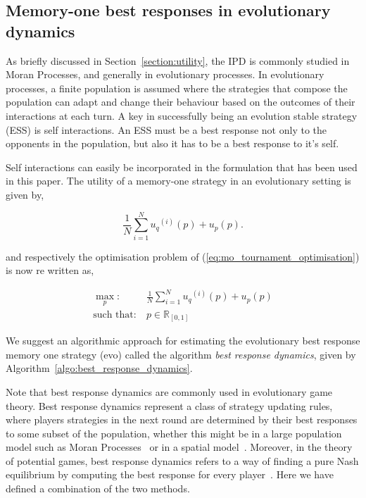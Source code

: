 \documentclass[10pt]{article}
\newcommand{\R}{\mathbb{R}}
\begin{document}
\subsection{Memory-one best responses in evolutionary dynamics}

As briefly discussed in Section~\ref{section:utility}, the IPD is commonly
studied in Moran Processes, and generally in evolutionary processes. In
evolutionary processes, a finite population is assumed where the strategies that
compose the population can adapt and change their behaviour based on the
outcomes of their interactions at each turn. A key in successfully being an
evolution stable strategy (ESS) is self interactions. An ESS must be a best
response not only to the opponents in the population, but also it has to be a
best response to it's self.

Self interactions can easily be incorporated in the formulation that has been used
in this paper. The utility of a memory-one strategy in an evolutionary setting
is given by,

\begin{equation}
    \frac{1}{N} \sum\limits_{i=1} ^ {N} {u_q}^{(i)} (p) + u_p(p).
\end{equation}

and respectively the optimisation problem of (\ref{eq:mo_tournament_optimisation})
is now re written as,

\begin{equation}\label{eq:mo_evolutionary_optimisation}
    \begin{aligned}
    \max_p: & \ \frac{1}{N} \sum\limits_{i=1} ^ {N} {u_q}^{(i)} (p) + u_p(p)
    \\
    \text{such that}: & \ p \in \R_{[0, 1]}
    \end{aligned}
\end{equation}

We suggest an algorithmic approach for estimating the evolutionary best response memory
one strategy (evo) called the algorithm \textit{best response dynamics}, given
by Algorithm~\ref{algo:best_response_dynamics}.

Note that best response dynamics are commonly used in evolutionary game theory. Best
response dynamics represent a class of strategy updating rules, where players
strategies in the next round are determined by their best responses to some
subset of the population, whether this might be in a large population model
such as Moran Processes~\cite{Knight2018} or in a spatial model~\cite{Nowak1992}.
Moreover, in the theory of potential games, best response dynamics
refers to a way of finding a pure Nash equilibrium by computing the best response for
every player~\cite{Nisan2007}. Here we have defined a combination of the two methods.
\end{document}
